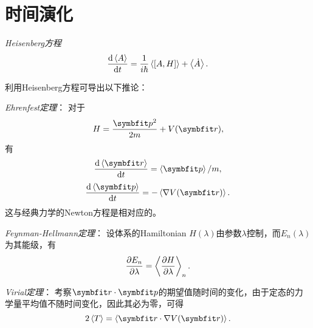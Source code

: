 \section{时间演化}

\emph{Heisenberg方程}
\begin{equation}
    \frac{\dd \expval{A}}{\dd t} = \frac{1}{i\hbar}\expval{[A,H]} + \expval{\dot{A}}.
\end{equation}

利用Heisenberg方程可导出以下推论：

\emph{Ehrenfest定理}：
对于
\begin{equation}
    H = \frac{\pp^2}{2m} + V(\rr),
\end{equation}
有
\begin{equation}
    \frac{\dd \expval{\rr}}{\dd t} = \expval{\pp}/m,
\end{equation}
\begin{equation}
    \frac{\dd \expval{\pp}}{\dd t} = -\expval{\nabla V(\rr)}.
\end{equation}
这与经典力学的Newton方程是相对应的。

\emph{Feynman-Hellmann定理}：
设体系的Hamiltonian $H(\lambda)$由参数$\lambda$控制，而$E_n(\lambda)$为其能级，有
\begin{equation}
    \frac{\partial E_n}{\partial \lambda} = \expval{\frac{\partial H}{\partial\lambda}}_n.
\end{equation}

\emph{Virial定理}：
考察$\rr\cdot\pp$的期望值随时间的变化，由于定态的力学量平均值不随时间变化，因此其必为零，可得
\begin{equation}
    2\expval{T} = \expval{\rr\cdot\nabla V(\rr)}.
\end{equation}
